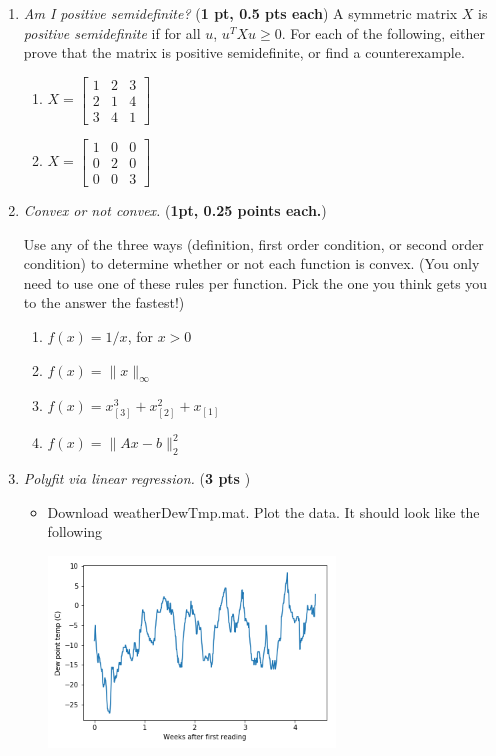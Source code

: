 \documentclass{article}
\newcommand{\idx}[1]{_{[#1]}}
\newcommand{\bmat}{\left[\begin{matrix}}
\newcommand{\emat}{\end{matrix}\right]}
\newcommand{\showpoints}[1]{(\textbf{#1})}
\begin{document}
\begin{enumerate}
\begin{enumerate}
\end{enumerate}

\item \emph{Am I positive semidefinite?} \showpoints{1 pt, 0.5 pts each}  A symmetric matrix $X$ is \emph{positive semidefinite} if for all $u$, $u^TXu \geq 0$. For each of the following, either prove that the matrix is positive semidefinite, or find a counterexample. 

\begin{enumerate}
\item 
$
X = \bmat 
1 & 2 & 3 \\ 2& 1 & 4 \\ 3 & 4 & 1
\emat
$




 \item $
X = \bmat 
1 & 0 & 0 \\ 0& 2 & 0 \\ 0 & 0 & 3
\emat$



\end{enumerate}


\item  \emph{Convex or not convex.} \showpoints{1pt, 0.25 points each.}
 
Use any of the three ways (definition, first order condition, or second order condition) to determine whether or not each function is convex. (You only need to use one of these rules per function. Pick the one you think gets you to the answer the fastest!)

\begin{enumerate}


\item $f(x) = 1/x$, for $x > 0$


\item $f(x) = \|x\|_\infty$

\item $f(x) = x\idx{3}^3+x\idx{2}^2+x\idx{1}$


\item $f(x) = \|Ax-b\|_2^2$

\end{enumerate}




\item \emph{Polyfit via linear regression.} \showpoints{3 pts } 

\begin{itemize}
\item Download weatherDewTmp.mat. Plot the data. It should look like the following
\begin{center}
\includegraphics[width=3in]{polyfit_orig.png}
\end{center}



\end{itemize}
\end{enumerate}
\end{document}

